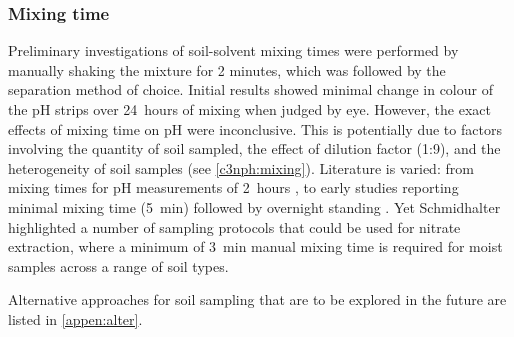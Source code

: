 \subsubsection{Mixing time}

Preliminary investigations of soil-solvent mixing times were performed by manually shaking the mixture for 2 minutes, which was followed by the separation method of choice. Initial results showed minimal change in colour of the pH strips over \SI{24}{hours} of mixing when judged by eye. However, the exact effects of mixing time on pH were inconclusive. This is potentially due to factors involving the quantity of soil sampled, the effect of dilution factor (1:9), and the heterogeneity of soil samples (see \cref{c3nph:mixing}). Literature is varied: from mixing times for pH measurements of \SI{2}{hours} \cite{Mitchell2013}, to early studies reporting minimal mixing time (\SI{5}{min}) followed by overnight standing \cite{Farr1972}. Yet Schmidhalter \cite{Schmidhalter2005} highlighted a number of sampling protocols that could be used for nitrate extraction, where a minimum of \SI{3}{min} manual mixing time is required for moist samples across a range of soil types.

Alternative approaches for soil sampling that are to be explored in the future are listed in \cref{appen:alter}.







